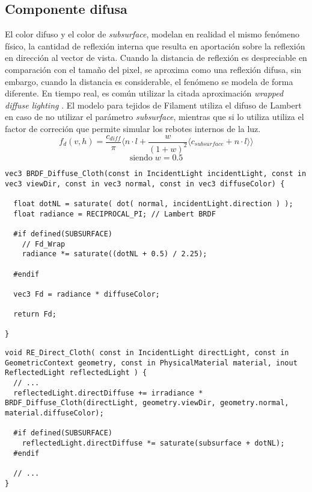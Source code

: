   \subsection{Componente difusa}
  El color difuso y el color de \textit{subsurface}, modelan en realidad el mismo fen\'omeno f\'isico, la cantidad de reflexi\'on
  interna que resulta en aportaci\'on sobre la reflexi\'on en direcci\'on al vector de vista. Cuando la distancia de reflexi\'on
  es despreciable en comparaci\'on con el tama\~no del pixel, se aproxima como una reflexi\'on difusa, sin embargo, cuando
  la distancia es considerable, el fen\'omeno se modela de forma diferente. En tiempo real, es com\'un utilizar la citada aproximaci\'on
  \textit{wrapped diffuse lighting} \autocite{orennayar}.
  El modelo para tejidos de Filament utiliza el difuso de Lambert en caso de no utilizar el par\'ametro \textit{subsurface},
  mientras que si lo utiliza utiliza el factor de correci\'on que permite simular los rebotes internos de la luz.\\

  $$
  f_d(v, h) = \frac{c_{diff}}{\pi}
  \Bigg\langle
  n\cdot{l} + \frac{w}{(1+ w)^2}\langle c_{subsurface} + n \cdot{l} \rangle
  \Bigg\rangle
  $$
  \begin{equation}
  \textrm{siendo}\; w = 0.5
  \end{equation}
  \singlespacing

  \begin{lstlisting}[caption=Cambios sobre la clase WebGLPrograms de ThreeJs]
vec3 BRDF_Diffuse_Cloth(const in IncidentLight incidentLight, const in vec3 viewDir, const in vec3 normal, const in vec3 diffuseColor) {

  float dotNL = saturate( dot( normal, incidentLight.direction ) );
  float radiance = RECIPROCAL_PI; // Lambert BRDF
  
  #if defined(SUBSURFACE)
    // Fd_Wrap
    radiance *= saturate((dotNL + 0.5) / 2.25);

  #endif

  vec3 Fd = radiance * diffuseColor;

  return Fd;

}
  \end{lstlisting}

  \begin{lstlisting}[caption=Cambios sobre la clase WebGLPrograms de ThreeJs]
void RE_Direct_Cloth( const in IncidentLight directLight, const in GeometricContext geometry, const in PhysicalMaterial material, inout ReflectedLight reflectedLight ) {
  // ...
  reflectedLight.directDiffuse += irradiance * BRDF_Diffuse_Cloth(directLight, geometry.viewDir, geometry.normal, material.diffuseColor);

  #if defined(SUBSURFACE)
    reflectedLight.directDiffuse *= saturate(subsurface + dotNL); 
  #endif

  // ...
}
  \end{lstlisting}


